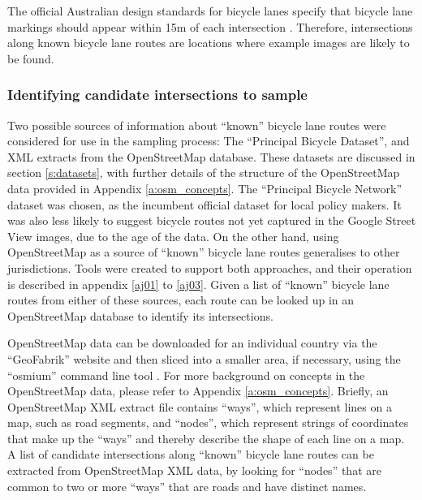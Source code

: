 \documentclass[11pt,twoside]{report}
\begin{document}
The official Australian design standards for bicycle lanes specify that bicycle lane markings should appear within 15m of each intersection \cite{standards}.  Therefore, intersections along known bicycle lane routes are locations where example images are likely to be found.

\subsubsection{Identifying candidate intersections to sample}
\label{s:sample_candidates}

Two possible sources of information about ``known'' bicycle lane routes were considered for use in the sampling process:  The ``Principal Bicycle Dataset'', and XML extracts from the OpenStreetMap database.  These datasets are discussed in section \ref{s:datasets}, with further details of the structure of the OpenStreetMap data provided in Appendix \ref{a:osm_concepts}.  The ``Principal Bicycle Network'' dataset was chosen, as the incumbent official dataset for local policy makers.  It was also less likely to suggest bicycle routes not yet captured in the Google Street View images, due to the age of the data.  On the other hand, using OpenStreetMap as a source of ``known'' bicycle lane routes generalises to other jurisdictions.  Tools were created to support both approaches, and their operation is described in appendix \ref{aj01} to \ref{aj03}.  Given a list of ``known'' bicycle lane routes from either of these sources, each route can be looked up in an OpenStreetMap database to identify its intersections.

OpenStreetMap data can be downloaded for an individual country via the ``GeoFabrik'' website \cite{geofabrik} and then sliced into a smaller area, if necessary, using the ``osmium'' command line tool \cite{osmium}.  For more background on concepts in the OpenStreetMap data, please refer to Appendix \ref{a:osm_concepts}.  Briefly, an OpenStreetMap XML extract file contains ``ways'', which represent lines on a map, such as road segments, and ``nodes'', which represent strings of coordinates that make up the ``ways'' and thereby describe the shape of each line on a map.  A list of candidate intersections along ``known'' bicycle lane routes can be extracted from OpenStreetMap XML data, by looking for ``nodes'' that are common to two or more ``ways'' that are roads and have distinct names.
\end{document}
